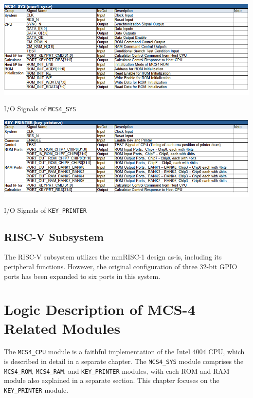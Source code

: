 \begin{table}[htbp]
    \includegraphics[width=1.00\columnwidth]{./Table/SignalsMCS4SYS.png}
    \caption{I/O Signals of \texttt{MCS4\_SYS}}
    \label{tb:SIGNALSMCS4SYS}
\end{table}
\begin{table}[htbp]
    \includegraphics[width=1.00\columnwidth]{./Table/SignalsKEYPRINTER.png}
    \caption{I/O Signals of \texttt{KEY\_PRINTER}}
    \label{tb:SIGNALSKEYPRINTER}
\end{table}

\subsection{RISC-V Subsystem}
The RISC-V subsystem utilizes the mmRISC-1\cite{mmRISC-1} design as-is, including its peripheral functions. However, the original configuration of three 32-bit GPIO ports has been expanded to six ports in this system.

\section{Logic Description of MCS-4 Related Modules}
The \texttt{MCS4\_CPU} module is a faithful implementation of the Intel 4004 CPU, which is described in detail in a separate chapter. The \texttt{MCS4\_SYS} module comprises the \texttt{MCS4\_ROM}, \texttt{MCS4\_RAM}, and \texttt{KEY\_PRINTER} modules, with each ROM and RAM module also explained in a separate section. This chapter focuses on the \texttt{KEY\_PRINTER} module.

